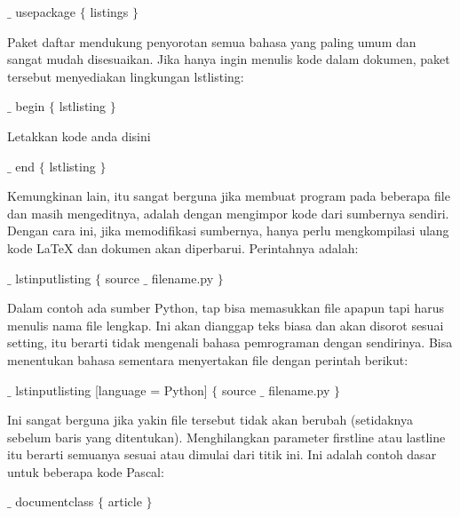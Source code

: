 $ \_ $  usepackage  $ \{ $ listings $ \} $

\vspace{12pt}
\hspace{0.50in}Paket daftar mendukung penyorotan semua bahasa yang paling umum dan sangat mudah disesuaikan. Jika hanya ingin menulis kode dalam dokumen, paket tersebut menyediakan lingkungan lstlisting: \par
$ \_ $  begin  $ \{ $ lstlisting $ \} $ \par

Letakkan kode anda disini  \par 
 
$ \_ $ end  $ \{ $ lstlisting $ \} $ \par
 
\vspace{12pt}
\hspace{0.50in} Kemungkinan lain, itu sangat berguna jika membuat program pada beberapa file dan masih mengeditnya, adalah dengan mengimpor kode dari sumbernya sendiri. Dengan cara ini, jika memodifikasi sumbernya,  hanya perlu mengkompilasi ulang kode LaTeX dan dokumen akan diperbarui. Perintahnya adalah: \par
$ \_ $  lstinputlisting  $ \{ $ source $ \_ $ filename.py $ \} $ \par

\vspace{12pt}
\hspace{0.50in} Dalam contoh ada sumber Python, tap bisa memasukkan file apapun tapi harus menulis nama file lengkap. Ini akan dianggap teks biasa dan akan disorot sesuai setting, itu berarti tidak mengenali bahasa pemrograman dengan sendirinya. Bisa menentukan bahasa sementara menyertakan file dengan perintah berikut: \par

 $ \_ $  lstinputlisting [language = Python]  $ \{ $ source $ \_ $ filename.py $ \} $ \par

\vspace{12pt}
\hspace{0.50in} Ini sangat berguna jika yakin file tersebut tidak akan berubah (setidaknya sebelum baris yang ditentukan). Menghilangkan parameter firstline atau lastline itu berarti semuanya sesuai atau dimulai dari titik ini. Ini adalah contoh dasar untuk beberapa kode Pascal:\par


\noindent  $ \_ $ documentclass $ \{ $ article $ \} $ \par


